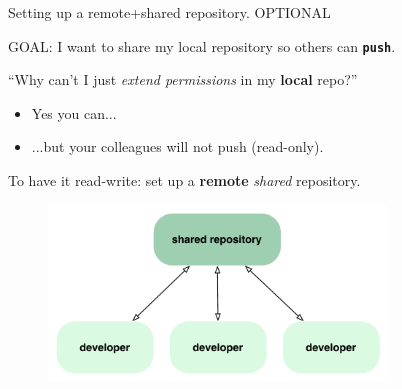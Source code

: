 \documentclass{beamer}
\begin{document}
\begin{frame}{Setting up a remote+shared repository. \alert{OPTIONAL}}
  \begin{center}
    GOAL: I want to share my local repository so others can \texttt{\textbf{push}}.
  \end{center}
  ``Why can't I just \emph{extend permissions} in my \textbf{local} repo?''
  \begin{itemize}
  \item Yes you can...
  \item ...but your colleagues will not push (\alert{read-only}).
  \end{itemize}
  \begin{center}
    To have it \alert{read-write}: set up a \textbf{remote}
    \emph{shared} repository.
  \end{center}
  \begin{figure}
    \centering
    \includegraphics[width=9cm]{figs/workflow-a}
  \end{figure}
\end{frame}
\end{document}
